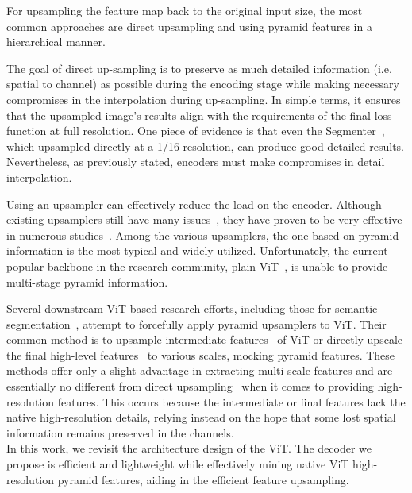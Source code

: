 For upsampling the feature map back to the original input size, the most common approaches are direct upsampling and using pyramid features in a hierarchical manner.

The goal of direct up-sampling is to preserve as much detailed information (i.e. spatial to channel) as possible during the encoding stage while making necessary compromises in the interpolation during up-sampling.
%
In simple terms, it ensures that the upsampled image's results align with the requirements of the final loss function at full resolution.
%
One piece of evidence is that even the Segmenter~\cite{cSegmenter}, which upsampled directly at a 1/16 resolution, can produce good detailed results.
%
Nevertheless, as previously stated, encoders must make compromises in detail interpolation.

Using an upsampler can effectively reduce the load on the encoder. 
Although existing upsamplers still have many issues~\cite{cHFGD}, they have proven to be very effective in numerous studies~\cite{cUNet,cFPN,cFaPN,cCART,cFastFCN}.
%
Among the various upsamplers, the one based on pyramid information is the most typical and widely utilized.
%
Unfortunately, the current popular backbone in the research community, plain ViT~\cite{cViT}, is unable to provide multi-stage pyramid information.

Several downstream ViT-based research efforts, including those for semantic segmentation~\cite{cSETR}, attempt to forcefully apply pyramid upsamplers to ViT.
%
Their common method is to upsample intermediate features~\cite{cSETR} of ViT or directly upscale the final high-level features~\cite{cViTDet} to various scales, mocking pyramid features.
%
These methods offer only a slight advantage in extracting multi-scale features and are essentially no different from direct upsampling~\cite{cSegmenter} when it comes to providing high-resolution features.
%
This occurs because the intermediate or final features lack the native high-resolution details, relying instead on the hope that some lost spatial information remains preserved in the channels.\\

In this work, we revisit the architecture design of the ViT. 
The decoder we propose is efficient and lightweight while effectively mining native ViT high-resolution pyramid features, aiding in the efficient feature upsampling.








